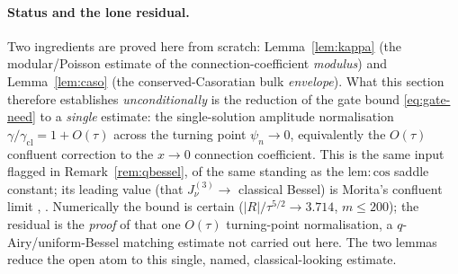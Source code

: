 \paragraph{Status and the lone residual.} Two ingredients are proved here from scratch:
Lemma~\ref{lem:kappa} (the modular/Poisson estimate of the connection-coefficient
\emph{modulus}) and Lemma~\ref{lem:caso} (the conserved-Casoratian bulk \emph{envelope}). What
this section therefore establishes \emph{unconditionally} is the reduction of the gate bound
\eqref{eq:gate-need} to a \emph{single} estimate: the single-solution amplitude normalisation
$\gamma/\gamma_{\mathrm{cl}}=1+O(\tau)$ across the turning point $\psi_n\to0$, equivalently the
$O(\tau)$ confluent correction to the $x\to0$ connection coefficient. This is the same input
flagged in Remark~\ref{rem:qbessel}, of the same standing as the $\mathrm{lem:cos}$ saddle
constant; its leading value (that $J^{(3)}_\nu\to$ classical Bessel) is Morita's confluent
limit \cite[Thm.~3.3]{Morita2011}, \cite{OldeDaalhuis1994}. Numerically the bound is certain
($|R|/\tau^{5/2}\to3.714$, $m\le200$); the residual is the \emph{proof} of that one $O(\tau)$
turning-point normalisation, a $q$-Airy/uniform-Bessel matching estimate not carried out here.
The two lemmas reduce the open atom to this single, named, classical-looking estimate.
